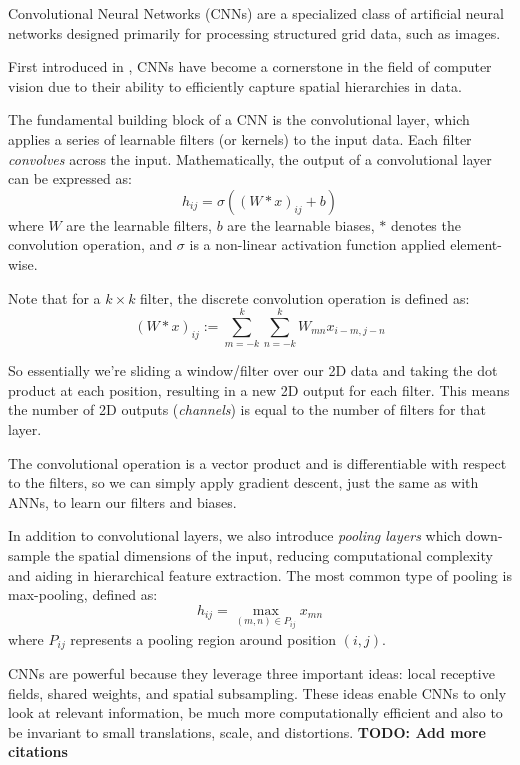 \documentclass[a4paper, oneside, notitlepage]{book}
\begin{document}
Convolutional Neural Networks (CNNs) are a specialized class of artificial neural 
networks designed primarily for processing structured grid data, such as images.

First introduced in \cite{LECUN1998}, CNNs have become a cornerstone in the field of
computer vision due to their ability to efficiently capture spatial hierarchies in data.

The fundamental building block of a CNN is the convolutional layer, which applies a
series of learnable filters (or kernels) to the input data.
Each filter \textit{convolves} across the input.
Mathematically, the output of a convolutional layer can be expressed as:
\begin{equation}
    h_{ij} = \sigma\left((W * x)_{ij} + b\right)
\end{equation}
where $W$ are the learnable filters, $b$ are the learnable biases,
$*$ denotes the convolution operation, and $\sigma$ is a non-linear 
activation function applied element-wise.

Note that for a $k\times k$ filter, the discrete convolution operation is defined as:
\begin{equation}
    (W * x)_{ij} := \sum_{m=-k}^{k}\sum_{n=-k}^{k} W_{mn} x_{i-m, j-n}
\end{equation}

So essentially we're sliding a window/filter over our 2D data and taking the dot product
at each position, resulting in a new 2D output for each filter.
This means the number of 2D outputs (\textit{channels}) is equal to the number of filters
for that layer.

The convolutional operation is a vector product and is differentiable with respect to
the filters, so we can simply apply gradient descent, just the same as with ANNs,
to learn our filters and biases.

In addition to convolutional layers, we also introduce \textit{pooling layers} 
which down-sample the spatial dimensions of the input, reducing computational
complexity and aiding in hierarchical feature extraction. 
The most common type of pooling is max-pooling, defined as:
\begin{equation}
    h_{ij} = \max_{(m,n) \in P_{ij}} x_{mn}
\end{equation}
where \(P_{ij}\) represents a pooling region around position $(i,j)$.


CNNs are powerful because they leverage three important ideas: local receptive fields, 
shared weights, and spatial subsampling. These ideas enable CNNs to only look at relevant information,
be much more computationally efficient and also to be invariant to small translations, scale, and distortions.
\textbf{TODO: Add more citations}
\end{document}
